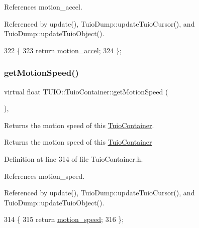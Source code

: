References motion\+\_\+accel.



Referenced by update(), Tuio\+Dump\+::update\+Tuio\+Cursor(), and Tuio\+Dump\+::update\+Tuio\+Object().


\begin{DoxyCode}
322                                        \{
323             \textcolor{keywordflow}{return} \hyperlink{class_t_u_i_o_1_1_tuio_container_adaa20f12158aee41f7502da330f2a97e}{motion\_accel};
324         \};
\end{DoxyCode}
\mbox{\label{class_t_u_i_o_1_1_tuio_container_ad8c0682163804a1f7e7e908d10272e20}} 
\subsubsection{\texorpdfstring{get\+Motion\+Speed()}{getMotionSpeed()}}
{\footnotesize\ttfamily virtual float T\+U\+I\+O\+::\+Tuio\+Container\+::get\+Motion\+Speed (\begin{DoxyParamCaption}{ }\end{DoxyParamCaption})\hspace{0.3cm}{\ttfamily [inline]}, {\ttfamily [virtual]}}

Returns the motion speed of this \hyperlink{class_t_u_i_o_1_1_tuio_container}{Tuio\+Container}. \begin{DoxyReturn}{Returns}
the motion speed of this \hyperlink{class_t_u_i_o_1_1_tuio_container}{Tuio\+Container} 
\end{DoxyReturn}


Definition at line 314 of file Tuio\+Container.\+h.



References motion\+\_\+speed.



Referenced by update(), Tuio\+Dump\+::update\+Tuio\+Cursor(), and Tuio\+Dump\+::update\+Tuio\+Object().


\begin{DoxyCode}
314                                        \{
315             \textcolor{keywordflow}{return} \hyperlink{class_t_u_i_o_1_1_tuio_container_a7810725234e427d4508f6b6a9874723b}{motion\_speed};
316         \};
\end{DoxyCode}
\mbox{\label{class_t_u_i_o_1_1_tuio_container_a441c2b43473a13c686b9ccdce573f368}} 
